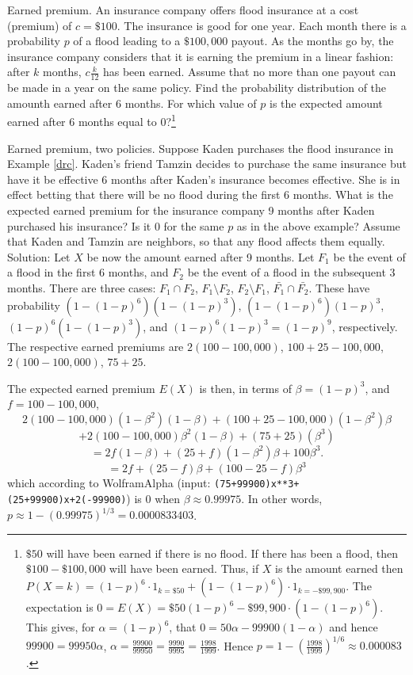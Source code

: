 \begin{example}{Earned premium.}\label{drc}
	An insurance company offers flood insurance at a cost (premium) of $c=\$100$.
	The insurance is good for one year. Each month there is a probability $p$ of a flood leading to a $\$100,000$ payout.
	As the months go by, the insurance company considers that it is earning the premium in a linear fashion:
	after $k$ months, $c\frac{k}{12}$ has been earned.
	Assume that no more than one payout can be made in a year on the same policy.
	Find the probability distribution of the amounth earned after 6 months.
	For which value of $p$ is the expected amount earned after 6 months equal to 0?\footnote{
		$\$50$ will have been earned if there is no flood.
		If there has been a flood, then $\$100-\$100,000$ will have been earned.
		Thus, if $X$ is the amount earned then
		$P(X=k)=(1-p)^6\cdot 1_{k=\$50} + (1-(1-p)^6)\cdot 1_{k=-\$99,900}$.
		The expectation is $0=E(X)=\$50 (1-p)^6 - \$99,900\cdot (1-(1-p)^6)$.
		This gives, for $\alpha=(1-p)^6$, that $0=50\alpha-99900(1-\alpha)$ and hence
		$99900=99950\alpha$, $\alpha=\frac{99900}{99950}=\frac{9990}{9995}=\frac{1998}{1999}$.
		Hence $p=1-\left(\frac{1998}{1999}\right)^{1/6}\approx 0.000083$.
	}
\end{example}
\begin{example}{Earned premium, two policies.}
	Suppose Kaden purchases the flood insurance in Example \ref{drc}. Kaden's friend Tamzin decides to purchase the same insurance
	but have it be effective 6 months after Kaden's insurance becomes effective. She is in effect betting that there will be no
	flood during the first 6 months.
	What is the expected earned premium for the insurance company 9 months after Kaden purchased his insurance?
	Is it 0 for the same $p$ as in the above example?
	Assume that Kaden and Tamzin are neighbors, so that any flood affects them equally.
	Solution:
		Let $X$ be now the amount earned after 9 months.
		Let $F_1$ be the event of a flood in the first 6 months, and $F_2$ be the event of a flood in the subsequent 3 months.
		There are three cases:
		$F_1\cap F_2$,
		$F_1\setminus F_2$,
		$F_2\setminus F_1$,
		$\bar{F_1}\cap\bar{F_2}$.
		These have probability
		$(1-(1-p)^6)(1-(1-p)^3)$,
		$(1-(1-p)^6)(1-p)^3$,
		$(1-p)^6(1-(1-p)^3)$, and
		$(1-p)^6(1-p)^3=(1-p)^9$, respectively.
		The respective earned premiums are
		$2(100-100,000)$,
		$100+25-100,000$,
		$2(100-100,000)$,
		$75+25$.
		
		The expected earned premium $E(X)$ is then, in terms of $\beta=(1-p)^3$, and $f=100-100,000$,
		\[
		2(100-100,000) (1-\beta^2)(1-\beta) +
		(100+25-100,000) (1-\beta^2)\beta
		\]
		\[ +
		2(100-100,000) \beta^2(1-\beta) +
		(75+25)(\beta^3)
		\]
		\[
			= 2f(1-\beta) + (25+f)(1-\beta^2)\beta + 100\beta^3.
		\]
		\[
			= 2f + (25-f)\beta + (100-25-f)\beta^3
		\]
		which according to WolframAlpha (input:
			\verb!(75+99900)x**3+(25+99900)x+2(-99900)!)
		is 0 when $\beta\approx 0.99975$. In other words,
		$p\approx 1-(0.99975)^{1/3}=0.0000833403$.
\end{example}